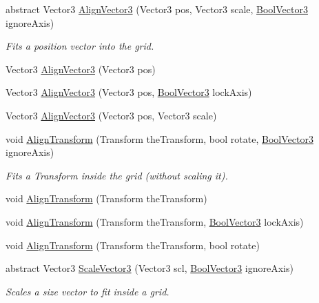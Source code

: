 \begin{DoxyCompactItemize}
abstract Vector3 \hyperlink{class_g_f_grid_a18b3e57431dc0db8f651479e4fb04a8f_a18b3e57431dc0db8f651479e4fb04a8f}{Align\+Vector3} (Vector3 pos, Vector3 scale, \hyperlink{class_grid_framework_1_1_vectors_1_1_bool_vector3}{Bool\+Vector3} ignore\+Axis)
\begin{DoxyCompactList}\small\item\em Fits a position vector into the grid.\end{DoxyCompactList}\item 
Vector3 \hyperlink{class_g_f_grid_a2c87287a14b02923c9c28aa9d7478eb5_a2c87287a14b02923c9c28aa9d7478eb5}{Align\+Vector3} (Vector3 pos)
\item 
Vector3 \hyperlink{class_g_f_grid_a60adb854cc78a01495dea15affdd158c_a60adb854cc78a01495dea15affdd158c}{Align\+Vector3} (Vector3 pos, \hyperlink{class_grid_framework_1_1_vectors_1_1_bool_vector3}{Bool\+Vector3} lock\+Axis)
\item 
Vector3 \hyperlink{class_g_f_grid_ac08b9392f196d7c87133e343cee64824_ac08b9392f196d7c87133e343cee64824}{Align\+Vector3} (Vector3 pos, Vector3 scale)
\item 
void \hyperlink{class_g_f_grid_ae1005d6635174bc14e02deb4784a8d09_ae1005d6635174bc14e02deb4784a8d09}{Align\+Transform} (Transform the\+Transform, bool rotate, \hyperlink{class_grid_framework_1_1_vectors_1_1_bool_vector3}{Bool\+Vector3} ignore\+Axis)
\begin{DoxyCompactList}\small\item\em Fits a Transform inside the grid (without scaling it).\end{DoxyCompactList}\item 
void \hyperlink{class_g_f_grid_a66b4191eeae96aa23f0ced78f4cc7e14_a66b4191eeae96aa23f0ced78f4cc7e14}{Align\+Transform} (Transform the\+Transform)
\item 
void \hyperlink{class_g_f_grid_a575acf49adeedb3e1cb59108b3c89262_a575acf49adeedb3e1cb59108b3c89262}{Align\+Transform} (Transform the\+Transform, \hyperlink{class_grid_framework_1_1_vectors_1_1_bool_vector3}{Bool\+Vector3} lock\+Axis)
\item 
void \hyperlink{class_g_f_grid_a05a7ee949a05d384656ea1b0befbe485_a05a7ee949a05d384656ea1b0befbe485}{Align\+Transform} (Transform the\+Transform, bool rotate)
\item 
abstract Vector3 \hyperlink{class_g_f_grid_a02b3cf14a1529355c51e0d3ea646b4f8_a02b3cf14a1529355c51e0d3ea646b4f8}{Scale\+Vector3} (Vector3 scl, \hyperlink{class_grid_framework_1_1_vectors_1_1_bool_vector3}{Bool\+Vector3} ignore\+Axis)
\begin{DoxyCompactList}\small\item\em Scales a size vector to fit inside a grid.\end{DoxyCompactList}\item 

\end{DoxyCompactItemize}
